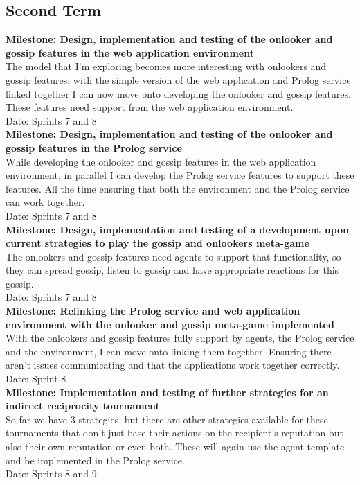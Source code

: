 \documentclass{article}
\begin{document}
\subsection*{Second Term}

\noindent\textbf{Milestone: Design, implementation and testing of the onlooker and gossip features in the web application environment}\\
The model that I'm exploring becomes more interesting with onlookers and gossip features, with the simple version of the web application and Prolog service linked together I can now move onto developing the onlooker and gossip features. These features need support from the web application environment.\\
Date: Sprints 7 and 8\\

\noindent\textbf{Milestone: Design, implementation and testing of the onlooker and gossip features in the Prolog service}\\
While developing the onlooker and gossip features in the web application environment, in parallel I can develop the Prolog service features to support these features. All the time ensuring that both the environment and the Prolog service can work together.\\
Date: Sprints 7 and 8\\

\noindent\textbf{Milestone: Design, implementation and testing of a development upon current strategies to play the gossip and onlookers meta-game}\\
The onlookers and gossip features need agents to support that functionality, so they can spread gossip, listen to gossip and have appropriate reactions for this gossip.\\
Date: Sprints 7 and 8\\

\noindent\textbf{Milestone: Relinking the Prolog service and web application environment with the onlooker and gossip meta-game implemented}\\
With the onlookers and gossip features fully support by agents, the Prolog service and the environment, I can move onto linking them together. Ensuring there aren't issues communicating and that the applications work together correctly.\\
Date: Sprint 8\\

\noindent\textbf{Milestone: Implementation and testing of further strategies for an indirect reciprocity tournament}\\
So far we have 3 strategies, but there are other strategies available for these tournaments that don't just base their actions on the recipient's reputation but also their own reputation or even both. These will again use the agent template and be implemented in the Prolog service.\\
Date: Sprints 8 and 9\\
\end{document}
